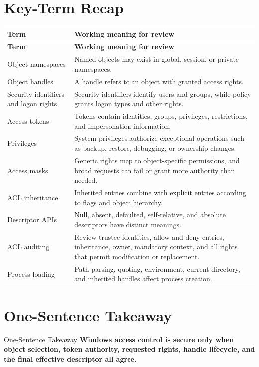 \documentclass[11pt,letterpaper]{article}
\begin{document}
\section{Key-Term Recap}
\begin{longtable}{>{\raggedright\arraybackslash}p{}p{}}
\toprule
\textbf{Term} & \textbf{Working meaning for review} \\
\midrule
\endfirsthead
\toprule
\textbf{Term} & \textbf{Working meaning for review} \\
\midrule
\endhead
Object namespaces & Named objects may exist in global, session, or private namespaces. \\
Object handles & A handle refers to an object with granted access rights. \\
Security identifiers and logon rights & Security identifiers identify users and groups, while policy grants logon types and other rights. \\
Access tokens & Tokens contain identities, groups, privileges, restrictions, and impersonation information. \\
Privileges & System privileges authorize exceptional operations such as backup, restore, debugging, or ownership changes. \\
Access masks & Generic rights map to object-specific permissions, and broad requests can fail or grant more authority than needed. \\
ACL inheritance & Inherited entries combine with explicit entries according to flags and object hierarchy. \\
Descriptor APIs & Null, absent, defaulted, self-relative, and absolute descriptors have distinct meanings. \\
ACL auditing & Review trustee identities, allow and deny entries, inheritance, owner, mandatory context, and all rights that permit modification or replacement. \\
Process loading & Path parsing, quoting, environment, current directory, and inherited handles affect process creation. \\
\bottomrule
\end{longtable}
\section{One-Sentence Takeaway}
\begin{CornellExamBox}{One-Sentence Takeaway}
\textbf{Windows access control is secure only when object selection, token authority, requested rights, handle lifecycle, and the final effective descriptor all agree.}
\end{CornellExamBox}
\end{document}
